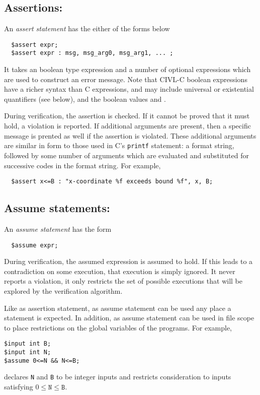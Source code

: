 \subsection{Assertions: \cassert}


An \emph{assert statement} has the either of the forms below
\begin{verbatim}
  $assert expr;
  $assert expr : msg, msg_arg0, msg_arg1, ... ;
\end{verbatim}

It takes an boolean type expression and a number of optional expressions which are used to construct an error message.
Note that CIVL-C boolean expressions have a richer syntax than C
expressions, and may include universal or existential quantifiers
(see below), and the boolean values  \ctrue{} and \cfalse{}.

During verification, the assertion is checked.  If it cannot be proved
that it must hold, a violation is reported. If additional arguments are present, then a specific message is prented as well if the assertion is violated.  These
additional arguments are similar in form to those used in C's
\texttt{printf} statement: a format string, followed by some number of
arguments which are evaluated and substituted for successive codes in
the format string.  For example,
\begin{verbatim}
  $assert x<=B : "x-coordinate %f exceeds bound %f", x, B; 
\end{verbatim}



\subsection{Assume statements: \cassume}

An \emph{assume statement} has the form
\begin{verbatim}
  $assume expr;
\end{verbatim}
During verification, the assumed expression is assumed to hold.  If
this leads to a contradiction on some execution, that execution is
simply ignored.  It never reports a violation, it only restricts the
set of possible executions that will be explored by the verification
algorithm.

Like as assertion statement, as assume statement can be used any place
a statement is expected.  In addition, as assume statement can be used
in file scope to place restrictions on the global variables of the
programs.  For example,
\begin{verbatim}
$input int B;
$input int N;
$assume 0<=N && N<=B;
\end{verbatim}
declares \texttt{N} and \texttt{B} to be integer inputs and restricts
consideration to inputs satisfying $0\leq\texttt{N}\leq\texttt{B}$.


